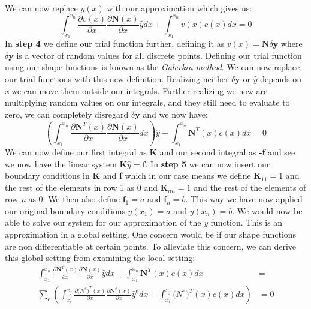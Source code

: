 We can now replace $y(x)$ with our approximation which gives us:
\begin{equation*}
	\int_{x_1}^{x_n} \frac{\partial v(x)}{\partial x}\frac{\partial \mathbf{N}(x)}{\partial x}\hat{y} dx + \int_{x_1}^{x_n} v(x)c(x) dx = 0
\end{equation*}
In \textbf{step 4} we define our trial function further, defining it as $v(x) = \mathbf{N}\delta\mathbf{y}$ where $\delta\mathbf{y}$ is a vector of random values for all discrete points. Defining our trial function using our shape functions is known as the \textit{Galerkin method}. We can now replace our trial functions with this new definition. Realizing neither $\delta\mathbf{y}$ or $\hat{y}$ depends on \textit{x} we can move them outside our integrals. Further realizing we now are multiplying random values on our integrals, and they still need to evaluate to zero, we can completely disregard $\delta\mathbf{y}$ and we now have:
\begin{equation*}
	\left(\int_{x_1}^{x_n} \frac{\partial \mathbf{N}^T(x)}{\partial x}\frac{\partial \mathbf{N}(x)}{\partial x} dx \right)\hat{y} + \int_{x_1}^{x_n} \mathbf{N}^T(x)c(x) dx = 0
\end{equation*}
We can now define our first integral as \textbf{K} and our second integral as \textbf{-f} and see we now have the linear system $\mathbf{K}\hat{y} = \mathbf{f}$. In \textbf{step 5} we can now insert our boundary conditions in \textbf{K} and \textbf{f} which in our case means we define $\mathbf{K}_{11} = 1$ and the rest of the elements in row 1 as 0 and $\mathbf{K}_{nn} = 1$ and the rest of the elements of row \textit{n} as 0. We then also define $\mathbf{f}_1 = a$ and $\mathbf{f}_n = b$. This way we have now applied our original boundary conditions $y(x_1) = a$ and $y(x_n) = b$. We would now be able to solve our system for our approximation of the \textit{y} function. This is an approximation in a global setting. One concern would be if our shape functions are non differentiable at certain points. To alleviate this concern, we can derive this global setting from examining the local setting:
\begin{align*}
	\int_{x_1}^{x_n} \frac{\partial \mathbf{N}^T(x)}{\partial x}\frac{\partial \mathbf{N}(x)}{\partial x}\hat{y} dx + \int_{x_1}^{x_n} \mathbf{N}^T(x)c(x) dx& =\\ \sum_e \left(\int_{x_i}^{x_j} \frac{\partial \mathbf({N}^e)^T(x)}{\partial x}\frac{\partial \mathbf{N}^e(x)}{\partial x}\hat{y}^e dx + \int_{x_i}^{x_j} \mathbf({N}^e)^T(x)c(x) dx\right)& = 0
\end{align*}
